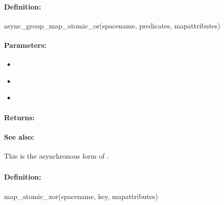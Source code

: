 \paragraph{Definition:}
\begin{rubycode}
async_group_map_atomic_or(spacename, predicates, mapattributes)
\end{rubycode}

\paragraph{Parameters:}
\begin{itemize}[noitemsep]
\item {}\\

\item {}\\

\item {}\\

\end{itemize}

\paragraph{Returns:}


\paragraph{See also:}  This is the asynchronous form of .

\pagebreak
\subsubsection{}
\label{api:ruby:map_atomic_xor}


\paragraph{Definition:}
\begin{rubycode}
map_atomic_xor(spacename, key, mapattributes)
\end{rubycode}


